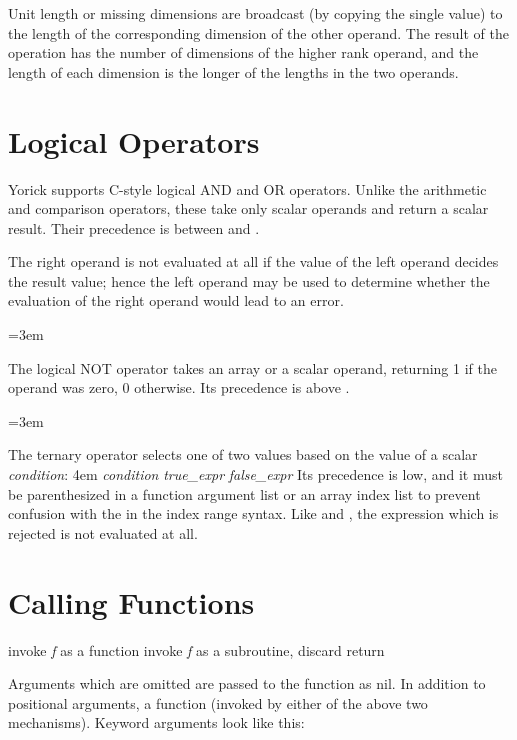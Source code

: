 Unit length or missing dimensions are broadcast (by copying the single
value) to the length of the corresponding dimension of the other
operand.  The result of the operation has the number of dimensions of
the higher rank operand, and the length of each dimension is the
longer of the lengths in the two operands.

\section{Logical Operators}

Yorick supports C-style logical AND and OR operators.  Unlike
the arithmetic and comparison operators, these take only scalar
operands and return a scalar  result.  Their precedence
is between \kbd{|} and \kbd{=}.

The right operand is not evaluated at all if the value of the
left operand decides the result value; hence the left operand
may be used to determine whether the evaluation of the right
operand would lead to an error.

\keyindent=3em
\endindentedkeys

The logical NOT operator takes an array or a scalar operand, returning
 1 if the operand was zero, 0 otherwise.  Its precedence is
above \kbd{\^{}}.

\keyindent=3em
\endindentedkeys

The ternary operator selects one of two values based on the value of a
scalar {\it condition}: \hfil\break
\hglue4em {\it condition}  {\it true\_expr} \kbd{:} {\it false\_expr}
\hfil\break
Its precedence is low, and it must be parenthesized in a function argument
list or an array index list to prevent confusion with the \kbd{:} in the
index range syntax.  Like \kbd{\&\&} and \kbd{||}, the expression which is
rejected is not evaluated at all.

\section{Calling Functions}

       {invoke {\it f} as a function}
       {invoke {\it f} as a subroutine, discard return}

Arguments which are omitted are passed to the function as nil.  In addition
to positional arguments, a function (invoked by either of the above two
mechanisms).  Keyword arguments look like this:

